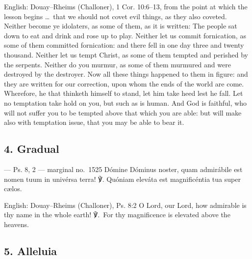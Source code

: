 \begin{namedtranslation}{English: Douay--Rheims (Challoner), 1 Cor. 10:6--13, from the point at which the lesson begins}
\dots\ that we should not covet evil things, as they also coveted. Neither
become ye idolaters, as some of them, as it is written: The people sat down to
eat and drink and rose up to play. Neither let us commit fornication, as some
of them committed fornication: and there fell in one day three and twenty
thousand. Neither let us tempt Christ, as some of them tempted and perished by
the serpents. Neither do you murmur, as some of them murmured and were
destroyed by the destroyer. Now all these things happened to them in figure:
and they are written for our correction, upon whom the ends of the world are
come. Wherefore, he that thinketh himself to stand, let him take heed lest he
fall. Let no temptation take hold on you, but such as is human. And God is
faithful, who will not suffer you to be tempted above that which you are able:
but will make also with temptation issue, that you may be able to bear it.
\end{namedtranslation}


\elementguard
\subsection*{4. Gradual }

\begin{appointedlatin}{ --- Ps. 8, 2 --- marginal no.\ 1525}
Dómine Dóminus noster, quam admirábile est nomen tuum in univérsa terra! ℣.
Quóniam eleváta est magnificéntia tua super cælos.
\end{appointedlatin}

\begin{namedtranslation}{English: Douay--Rheims (Challoner), Ps. 8:2}
O Lord, our Lord, how admirable is thy name in the whole earth! ℣.~For thy
magnificence is elevated above the heavens.
\end{namedtranslation}

\elementguard
\subsection*{5. Alleluia }

